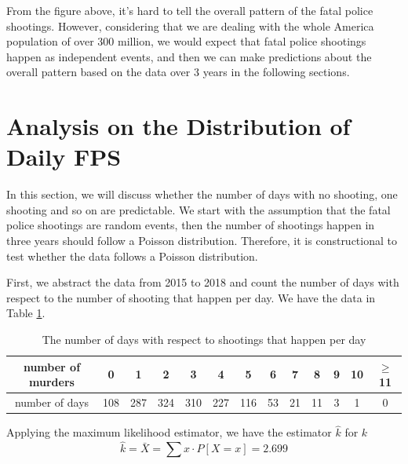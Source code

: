 \documentclass[a4paper]{article}
\begin{document}
{{From the figure above, it's hard to tell the overall pattern of the fatal police shootings. However, considering that we are dealing with the whole America population of over 300 million, we would expect that fatal police shootings happen as independent events, and then we can make predictions about the overall pattern based on the data over 3 years in the following sections.

\newpage
\section{Analysis on the Distribution of Daily FPS}%
In this section, we will discuss whether the number of days with no shooting, one shooting and so on are predictable. We start with the assumption that the fatal police shootings are random events, then the number of shootings happen in three years should follow a Poisson distribution. Therefore, it is constructional to test whether the data follows a Poisson distribution.

First, we abstract the data from 2015 to 2018 and count the number of days with respect to the number of shooting that happen per day. We have the data in Table \ref{ta1}.
\begin{table}[h]
\centering
    \begin{tabular}{c|cccccccccccc}
    \hline
    number of murders & 0 & 1 & 2 & 3 & 4 & 5 & 6 & 7 & 8 & 9 & 10 & $\geq$11\\
    \hline
    \hline
    number of days & 108 & 287 & 324 & 310 & 227 & 116 &53 &21 & 11 & 3 & 1 & 0\\
    \hline
    \end{tabular}
    \caption{The number of days with respect to  shootings that happen per day}
    \label{ta1}
\end{table}

Applying the maximum likelihood estimator, we have the estimator $\hat{k}$ for $k$
\begin{equation}
    \hat{k} = \bar{X} = \sum x\cdot P[X=x] = 2.699
\end{equation}

}}
\end{document}
